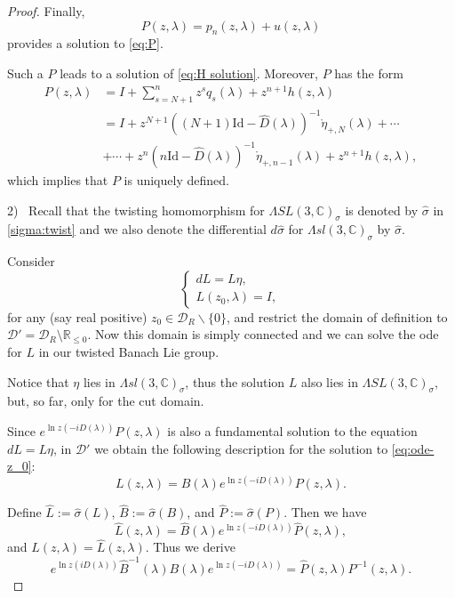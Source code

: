 \documentclass[a4paper,11pt]{amsart}
\theoremstyle{definition}
\numberwithin{equation}{section}
\newcommand{\R}{\mathbb{R}}
\begin{document}
\begin{proof}
Finally, 
$$P(z,\lambda)=p_{n}(z,\lambda)+u(z,\lambda)$$ 
provides a solution to \eqref{eq:P}.
 
Such a $P$ leads to a solution of \eqref{eq:H solution}. 
Moreover, $P$ has the form 
\begin{equation*}
\begin{aligned}
P(z,\lambda)&=I+\sum_{s=N+1}^n z^{s} q_s(\lambda) +z^{n+1}h(z,\lambda)\\
&=I+z^{N+1}((N+1)\mathrm{Id}-\hat{D}(\lambda))^{-1}\mathring{\eta}_{+,N}(\lambda)+\cdots\\
&+\cdots +z^n(n \mathrm{Id}-\hat{D}(\lambda))^{-1}\mathring{\eta}_{+,n-1}(\lambda)+z^{n+1}h(z,\lambda),
\end{aligned}
\end{equation*}
which implies that $P$ is uniquely defined.

\medskip


2) \, Recall that the  twisting homomorphism for $\Lambda SL(3,\mathbb{C})_{\sigma}$ is denoted by $\hat{\sigma}$ in \eqref{sigma:twist} and  we also denote the differential $d\hat{\sigma}$ for $\Lambda sl(3,\mathbb{C})_{\sigma}$  by $\hat{\sigma}$.

Consider \begin{equation}\label{eq:ode-z_0}
\begin{cases}
dL=L\eta,\\
L(z_0,\lambda)=I,
\end{cases}
\end{equation}
for any (say  real positive)
$z_0 \in \mathcal{D}_R\backslash\{0\}$, 
and restrict the domain of definition to $\mathcal{D}' = \mathcal{D}_R \setminus \R_{\leq 0}.$
Now this domain is simply connected and we can solve the ode for $L$ in our twisted Banach Lie group.

Notice that $\eta$ lies in $\Lambda sl(3,\mathbb{C})_{\sigma}$, thus the solution $L$ also lies in $\Lambda SL(3,\mathbb{C})_{\sigma}$, but, so far, only for the cut domain.
 
 Since $e^{\ln z(-iD(\lambda))}P(z,\lambda)$ is  also a fundamental solution to the equation $dL=L\eta$,  in $\mathcal{D}'$ we obtain the following description for  the solution to \eqref{eq:ode-z_0}:
 $$L(z,\lambda)=B(\lambda) e^{\ln z(-iD(\lambda))}P(z,\lambda).$$
 


Define $\hat{L}:=\hat{\sigma}(L)$, $\hat{B}:=\hat{\sigma}(B)$, and $\hat{P}:=\hat{\sigma}(P)$. 
Then we have
$$\hat{L}(z,\lambda)=\hat{B}(\lambda) e^{\ln z (-iD(\lambda))} \hat{P}(z,\lambda),$$
and $L(z,\lambda)=\hat{L}(z,\lambda)$. 
Thus we derive
$$e^{\ln z (i D(\lambda))} \hat{B}^{-1}(\lambda) B(\lambda) e^{\ln z (-iD(\lambda))}=\hat{P}(z,\lambda) P^{-1}(z,\lambda).$$


\end{proof}
\end{document}
